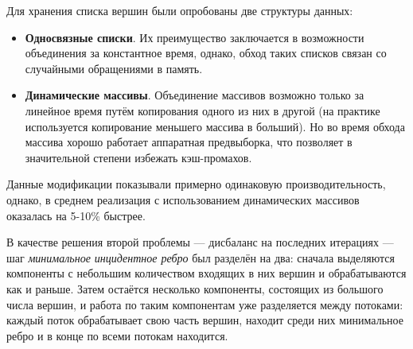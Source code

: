 \documentclass[a4paper,10pt]{extarticle}
\begin{document}
Для хранения списка вершин были опробованы две структуры данных:
\begin{itemize}
	\item \textbf{Односвязные списки}. Их преимущество заключается в возможности объединения за константное время, однако, обход таких списков связан со случайными обращениями в память.
	\item \textbf{Динамические массивы}. Объединение массивов возможно только за линейное время путём копирования одного из них в другой (на практике используется копирование меньшего массива в больший). Но во время обхода массива хорошо работает аппаратная предвыборка, что позволяет в значительной степени избежать кэш-промахов.
\end{itemize}
Данные модификации показывали примерно одинаковую производительность, однако, в среднем реализация с использованием динамических массивов оказалась на 5-10\% быстрее.

В качестве решения второй проблемы --- дисбаланс на последних итерациях --- шаг \textit{минимальное инцидентное ребро} был разделён на два: сначала выделяются компоненты с небольшим количеством входящих в них вершин и обрабатываются как и раньше. Затем остаётся несколько компоненты, состоящих из большого числа вершин, и работа по таким компонентам уже разделяется между потоками: каждый поток обрабатывает свою часть вершин, находит среди них минимальное ребро и в конце по всеми потокам находится. 

\end{document}
